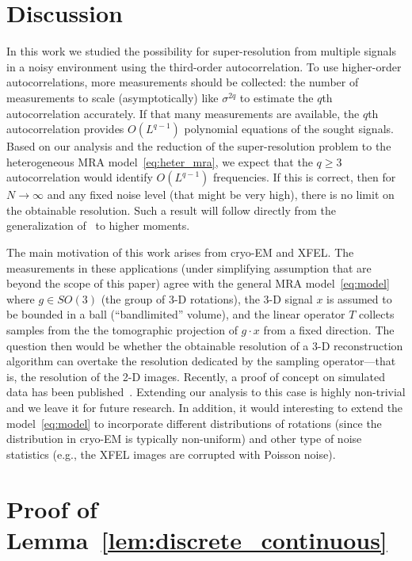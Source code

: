 \documentclass[english,12pt]{article}
\numberwithin{equation}{section}
\numberwithin{thm}{section} %
\begin{document}
\section{Discussion} \label{sec:future_work}


In this work we studied the possibility for super-resolution from multiple signals in a noisy environment using the third-order autocorrelation.
To use higher-order autocorrelations, more measurements should be collected: the number of measurements to scale (asymptotically) like $\sigma^{2q}$ to estimate the $q$th autocorrelation accurately.
If that many measurements are available, the $q$th autocorrelation provides $O(L^{q-1})$ polynomial equations of the sought signals.
Based on our analysis and the reduction of the super-resolution problem to the heterogeneous MRA model~\eqref{eq:heter_mra}, we expect that the $q\geq3$ autocorrelation would identify $O(L^{q-1})$ frequencies. 
If this is correct, then for $N\to\infty$ and any fixed noise level (that might be very high), there is no limit on the obtainable resolution.
Such a  result will follow directly from the generalization of~\cite{bandeira2017estimation} to higher moments. 

The main motivation of this work arises from cryo-EM and XFEL. 
The measurements in these applications  (under simplifying assumption that are beyond the scope of this paper)
agree with the general MRA model~\eqref{eq:model} where $g\in SO(3)$ (the group of 3-D rotations),  the 3-D signal $x$ is assumed to be bounded in a ball (``bandlimited'' volume), and the linear operator $T$ collects samples from the the tomographic projection of $g\cdot x$ from a fixed direction. The question then would be whether the obtainable resolution of a 3-D reconstruction algorithm can overtake the resolution dedicated by the sampling operator---that is, the resolution of the 2-D images. Recently, a proof of concept on simulated data has been published~\cite{chen2018single}. Extending our analysis to this case is highly non-trivial and we leave it for future research. 
In addition, it would interesting to extend the model~\eqref{eq:model} to incorporate  different distributions of rotations (since the  distribution in cryo-EM is typically non-uniform) and other type of noise statistics (e.g., the  XFEL images are corrupted with Poisson noise).





\appendix

\section{Proof of Lemma~\ref{lem:discrete_continuous}}  
\label{sec:proof_lem:discrete_continuous}
\end{document}
